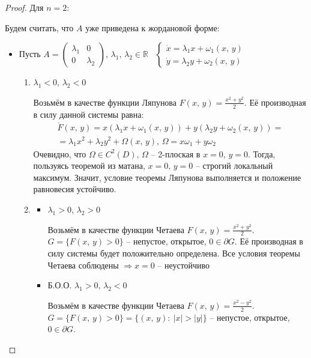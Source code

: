 \documentclass[a4paper,12pt]{article}
\theoremstyle{plain}
\theoremstyle{definition}
\theoremstyle{remark}
\begin{document}
\begin{proof}
	Для $n = 2$:

	Будем считать, что $A$ уже приведена к жордановой форме:

	\begin{itemize}
		\item Пусть $A = \begin{pmatrix}
				      \lambda_1 & 0         \\
				      0         & \lambda_2
			      \end{pmatrix},\, \lambda_1,\,\lambda_2 \in \mathbb{R}\;\;\;\begin{cases}
				      \dot{x} = \lambda_1x + \omega_1(x,\,y) \\
				      \dot{y} = \lambda_2y + \omega_2(x,\,y)
			      \end{cases}$
		      \begin{enumerate}
			      \item $\lambda_1 < 0,\, \lambda_2 < 0$

			            Возьмём в качестве функции Ляпунова $F(x,\,y) = \frac{x^2 + y^2}{2}$. Её производная в силу данной системы равна: 
									\begin{align*}
										\mathring{F}(x,\,y) = x(\lambda_1x + \omega_1(x,\,y)) + y(\lambda_2y + \omega_2(x,\,y)) = \\
										= \lambda_1x^2 + \lambda_2y^2 + \Omega(x,\,y),\, \Omega = x\omega_1 + y\omega_2
									\end{align*}
			            Очевидно, что $\Omega \in C^2(D),\, \Omega$ -- 2-плоская в $x = 0,\, y = 0$. Тогда, пользуясь теоремой из матана, $x = 0,\, y = 0$ -- строгий локальный максимум. Значит, условие теоремы Ляпунова выполняется и положение равновесия устойчиво.

			      \item \begin{itemize}
				            \item $\lambda_1 > 0,\, \lambda_2 > 0$

				                  Возьмём в качестве функции Четаева $F(x,\,y) = \frac{x^2 + y^2}{2}$. $G = \{F(x,\,y) > 0\}$ -- непустое, открытое, $0 \in \partial G$. Её производная в силу системы будет положительно определена. Все условия теоремы Четаева соблюдены $\Rightarrow x = 0$ -- неустойчиво
				            \item Б.О.О. $\lambda_1 > 0,\, \lambda_2 < 0$

				                  Возьмём в качестве функции Четаева $F(x,\,y) = \frac{x^2 - y^2}{2}$. $G = \{F(x,\,y) > 0\} = \{(x,\,y):\: |x| > |y|\}$ -- непустое, открытое, $0 \in \partial G$.


\end{itemize}
\end{enumerate}
\end{itemize}
\end{proof}
\end{document}
